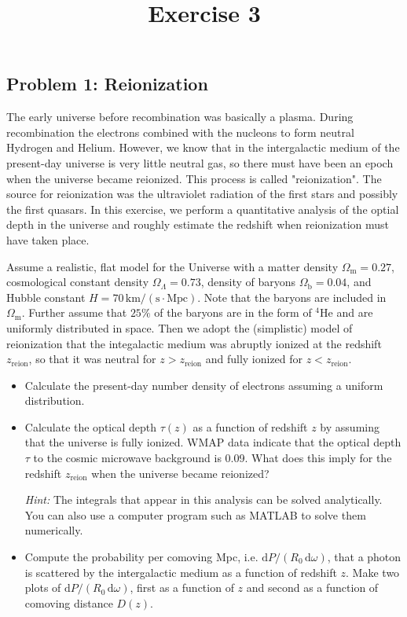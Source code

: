 \documentclass[a4paper]{article}
\begin{document}
\title{\textbf{Exercise 3}}
\author{}
\date{}

\maketitle

\subsection*{Problem 1: Reionization}

The early universe before recombination was basically a plasma. During recombination the electrons combined with the nucleons to form neutral Hydrogen and Helium. However, we know that in the intergalactic medium of the present-day universe is very little neutral gas, so there must have been an epoch when the universe became reionized. This process is called "reionization". The source for reionization was the ultraviolet radiation of the first stars and possibly the first quasars. In this exercise, we perform a quantitative analysis of the optial depth in the universe and roughly estimate the redshift when reionization must have taken place.
 
Assume a realistic, flat model for the Universe with a matter density $\Omega_\mathrm{m}=0.27$, cosmological constant  density $\Omega_\Lambda=0.73$, density of baryons $\Omega_\mathrm{b}=0.04$, and Hubble constant $H=70\,\mathrm{km/(s\cdot Mpc)}$. Note that the baryons are included in $\Omega_\mathrm{m}$. Further assume that $25\%$ of the baryons are in the form of $^4\mathrm{He}$ and are uniformly distributed in space. Then we adopt the (simplistic) model of reionization that the integalactic medium was abruptly ionized at the redshift $z_\mathrm{reion}$, so that it was neutral for $z>z_\mathrm{reion}$ and fully ionized for $z<z_\mathrm{reion}$.

\begin{itemize}
    \item[(a)] Calculate the present-day number density of electrons assuming a uniform distribution.
    
    \item[(b)] Calculate the optical depth $\tau(z)$ as a function of redshift $z$ by assuming that the universe is fully ionized. WMAP data indicate that the optical depth $\tau$ to the cosmic microwave background is 0.09. What does this imply for the redshift $z_\mathrm{reion}$ when the universe became reionized?

    \textit{Hint:} The integrals that appear in this analysis can be solved analytically. You can also use a computer program such as MATLAB to solve them numerically.

    \item[(c)] Compute the probability per comoving Mpc, i.e. $\mathrm{d}P/(R_0\,\mathrm{d}\omega)$, that a photon is scattered by the intergalactic medium as a function of redshift $z$. Make two plots of $\mathrm{d}P/(R_0\,\mathrm{d}\omega)$, first as a function of $z$ and second as a function of comoving distance $D(z)$.
\end{itemize}
\end{document}
